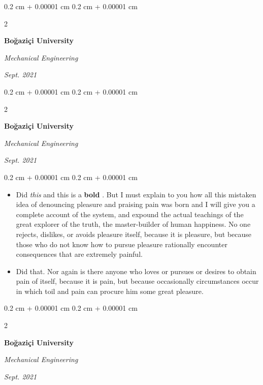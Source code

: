 \documentclass[10pt, letterpaper]{article}
\newenvironment{highlights}{
    \begin{itemize}[
        topsep=0.10 cm,
        parsep=0.10 cm,
        partopsep=0pt,
        itemsep=0pt,
        leftmargin=0.4 cm + 10pt
    ]
}{
    \end{itemize}
} %
\newenvironment{onecolentry}{
    \begin{adjustwidth}{
        0.2 cm + 0.00001 cm
    }{
        0.2 cm + 0.00001 cm
    }
}{
    \end{adjustwidth}
} %
\newenvironment{twocolentry}[2][]{
    \onecolentry
    \def\secondColumn{#2}
    \setcolumnwidth{\fill, 4.5 cm}
    \begin{paracol}{2}
}{
    \switchcolumn \raggedleft \secondColumn
    \end{paracol}
    \endonecolentry
} %
\let\hrefWithoutArrow\href
\renewcommand{\href}[2]{\hrefWithoutArrow{#1}{\mbox{\ifthenelse{\equal{#2}{}}{ }{#2 }\raisebox{.15ex}{\footnotesize \faExternalLink*}}}}
\begin{document}
        \vspace{0.2 cm-3px}

        \begin{twocolentry}{
            
            
        \textit{Sept. 2021}}
            \textbf{Boğaziçi University}

            \textit{Mechanical Engineering}
        \end{twocolentry}



        \vspace{0.2 cm-3px}

        \begin{twocolentry}{
            
            
        \textit{Sept. 2021}}
            \textbf{Boğaziçi University}

            \textit{Mechanical Engineering}
        \end{twocolentry}

        \vspace{0.10 cm-3px}
        \begin{onecolentry}
            \begin{highlights}
                \item Did \textit{this} and this is a \textbf{bold} \href{https://example.com}{link}. But I must explain to you how all this mistaken idea of denouncing pleasure and praising pain was born and I will give you a complete account of the system, and expound the actual teachings of the great explorer of the truth, the master-builder of human happiness. No one rejects, dislikes, or avoids pleasure itself, because it is pleasure, but because those who do not know how to pursue pleasure rationally encounter consequences that are extremely painful.
                \item Did that. Nor again is there anyone who loves or pursues or desires to obtain pain of itself, because it is pain, but because occasionally circumstances occur in which toil and pain can procure him some great pleasure.
            \end{highlights}
        \end{onecolentry}


        \vspace{0.2 cm-3px}

        \begin{twocolentry}{
            
            
        \textit{Sept. 2021}}
            \textbf{Boğaziçi University}

            \textit{Mechanical Engineering}
        \end{twocolentry}
\end{document}
